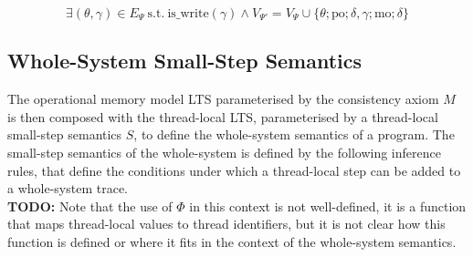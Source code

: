 \[
    \exists (\theta, \gamma) \in E_{\Psi} \: \text{s.t.} \: \text{is\_write}(\gamma)  \wedge V_{\Psi'} = V_{\Psi} \cup \{ \theta ; \text{po}; \delta, \gamma; \text{mo}; \delta \} 
\]  

\subsection{Whole-System Small-Step Semantics}
The operational memory model LTS parameterised by the consistency axiom \(M\) is then composed with the thread-local LTS, parameterised by a thread-local small-step semantics \(S\), to define the whole-system semantics of a program. 
The small-step semantics of the whole-system is defined by the following inference rules, that define the conditions under which a thread-local step can be added to a whole-system trace. \\ 

\textbf{TODO: } Note that the use of \(\Phi\) in this context is not well-defined, it is a function that maps thread-local values to thread identifiers, 
but it is not clear how this function is defined or where it fits in the context of the whole-system semantics. 

